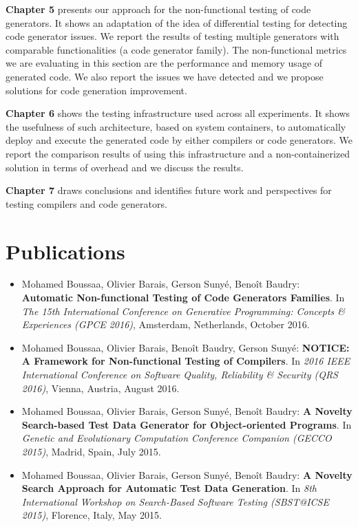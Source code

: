 \textbf{Chapter 5} presents our approach for the non-functional testing of code generators. It shows an adaptation of the idea of differential testing for detecting code generator issues. We report the results of testing multiple generators with comparable functionalities (a code generator family). The non-functional metrics we are evaluating in this section are the performance and memory usage of generated code. We also report the issues we have detected and we propose solutions for code generation improvement.

\textbf{Chapter 6} shows the testing infrastructure used across all experiments. It shows the usefulness of such architecture, based on system containers, to automatically deploy and execute the generated code by either compilers or code generators. We report the comparison results of using this infrastructure and a non-containerized solution in terms of overhead and we discuss the results. 

\textbf{Chapter 7} draws conclusions and identifies future work and perspectives for testing compilers and code generators.

\section{Publications}

\begin{itemize}
	
	\item Mohamed Boussaa, Olivier Barais, Gerson Suny\'e, Beno\^it Baudry:
	\textbf{Automatic Non-functional Testing of Code Generators Families}. In
	\textit{The 15th International Conference on Generative Programming: Concepts \& Experiences (GPCE 2016)},
	Amsterdam, Netherlands, October 2016.

	\item Mohamed Boussaa, Olivier Barais, Beno\^it Baudry, Gerson Suny\'e:
	\textbf{NOTICE: A Framework for Non-functional Testing of Compilers}. In 
	\textit{2016 IEEE International Conference on Software Quality, Reliability \& Security (QRS 2016)}, Vienna, Austria, August 2016.
	
	\item Mohamed Boussaa, Olivier Barais, Gerson Suny\'e, Beno\^it Baudry:
	\textbf{A Novelty Search-based Test Data Generator for Object-oriented Programs}. In 
	\textit{Genetic and Evolutionary Computation Conference Companion (GECCO 2015)}, 
	Madrid, Spain, July 2015.
	
	\item Mohamed Boussaa, Olivier Barais, Gerson Suny\'e, Beno\^it Baudry:
	\textbf{A Novelty Search Approach for Automatic Test Data Generation}. In
	\textit{8th International Workshop on Search-Based Software Testing (SBST@ICSE 2015)}, 
	Florence, Italy, May 2015.

	
	
\end{itemize}


